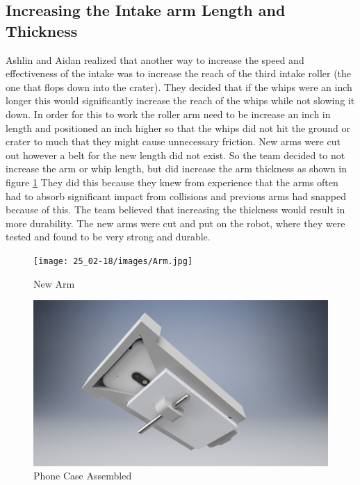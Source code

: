 \documentclass{article}
\begin{document}
\subsection{Increasing the Intake arm Length and Thickness}
Ashlin and Aidan realized that another way to increase the speed and effectiveness of the intake was to increase the reach of the third intake roller (the one that flops down into the crater). They decided that if the whips were an inch longer this would significantly increase the reach of the whips while not slowing it down. In order for this to work the roller arm need to be increase an inch in length and positioned an inch higher so that the whips did not hit the ground or crater to much that they might cause unnecessary friction. New arms were cut out however a belt for the new length did not exist. So the team decided to not increase the arm or whip length, but did increase the arm thickness as shown in figure \ref{fig:arm} They did this because they knew from experience that the arms often had to absorb significant impact from collisions and previous arms had snapped because of this. The team believed that increasing the thickness would result in more durability. The new arms were cut and put on the robot, where they were tested and found to be very strong and durable.

\begin{figure}
    \centering
    \texttt{[image: 25\_02-18/images/Arm.jpg]}
    \caption{New Arm}
    \label{fig:arm}
\end{figure}

\begin{figure}
    \centering
    \includegraphics[width= 0.5 \textwidth]{25_02-18/images/Phone.png}
    \caption{Phone Case Assembled}
    \label{fig: phone case}
\end{figure}
\end{document}
